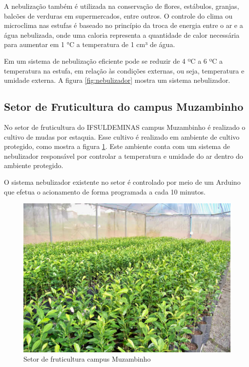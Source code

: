 A nebulização também é utilizada na conservação de flores, estábulos, granjas, balcões de verduras em supermercados, entre outros. O controle do clima ou microclima nas estufas é baseado no princípio da troca de energia entre o ar e a água nebulizada, onde uma caloria representa a quantidade de calor necessária para aumentar em 1 °C a temperatura de 1 cm³ de água.

Em um sistema de nebulização eficiente pode se reduzir de 4 ºC a 6 ºC a temperatura na estufa, em relação às condições externas, ou seja, temperatura e umidade externa. A figura \ref{fig:nebulizador} mostra um sistema nebulizador.

\subsection{Setor de Fruticultura do campus Muzambinho}

No setor de fruticultura do IFSULDEMINAS campus Muzambinho é realizado o cultivo de mudas por estaquia. Esse cultivo é realizado em ambiente de cultivo protegido, como mostra a figura \ref{fig:fruticultura}. Este ambiente conta com um sistema de nebulizador responsável por controlar a temperatura e umidade do ar dentro do ambiente protegido.

O sistema nebulizador existente no setor é controlado por meio de um Arduino que efetua o acionamento de forma programada a cada 10 minutos.

\begin{figure}[H]
    \centering
    \includegraphics[scale=1]{04-figuras/fruticultura.png}
    \caption{Setor de fruticultura campus Muzambinho}
    \vspace{-\baselineskip}
    \label{fig:fruticultura}
\end{figure}

